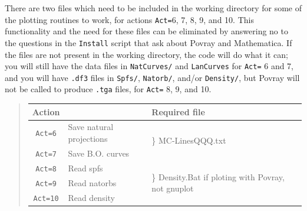 \documentclass[10pt,leqno, oneside]{book}
\begin{document}
There are two files which need to be included in the working directory for some of the plotting routines to work, for actions \verb#Act=#6, 7, 8, 9, and 10.  This functionality and the need for these files can be eliminated by answering no to the questions in the \verb#Install# script that ask about Povray and Mathematica.  If the files are not present in the working directory, the code will do what it can; you will still have the data files in \verb#NatCurves/# and \verb#LanCurves# for \verb#Act=# 6 and 7, and you will have \verb#.df3# files in \verb#Spfs/#, \verb#Natorb/#, and/or \verb#Density/#, but Povray will not be called to produce \verb#.tga# files, for \verb#Act=# 8, 9, and 10.
\begin{quote}
\begin{tabular}{cll}
Action & & Required file \\
\hline
\verb#Act=6# & Save natural projections & \multirow{2}{*}{{\Large\}} MC-LinesQQQ.txt} \\
\verb#Act=7# & Save B.O. curves & \\
\verb#Act=8# & Read spfs & \multirow{3}{*}{{\Huge\}} Density.Bat if  ploting with Povray, not gnuplot }\\
\verb#Act=9# & Read natorbs &\\
\verb#Act=10# & Read density &\\
\end{tabular}
\end{quote}


\end{document}
